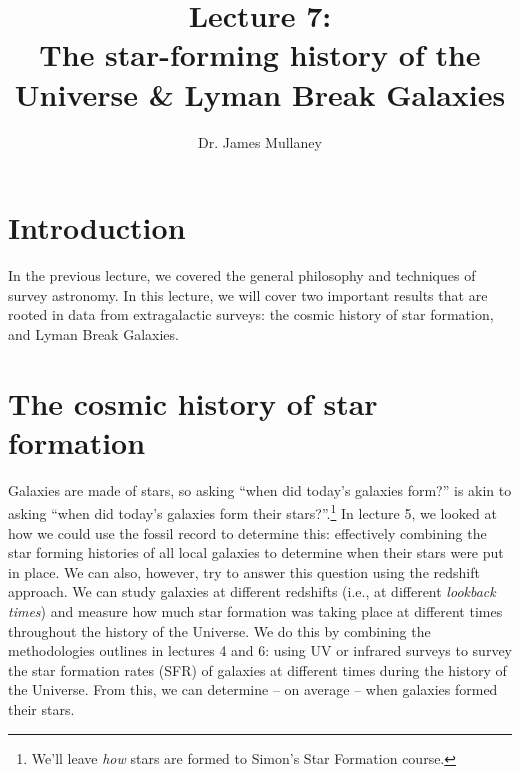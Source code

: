 \documentclass[11pt]{article}
\begin{document}
 
\title{Lecture 7:\\The star-forming history of the Universe \& Lyman Break Galaxies}
\author{Dr. James Mullaney}
\maketitle

\section{Introduction}
In the previous lecture, we covered the general philosophy and
techniques of survey astronomy. In this lecture, we will cover two
important results that are rooted in data from extragalactic surveys:
the cosmic history of star formation, and Lyman Break Galaxies.

\section{The cosmic history of star formation}
Galaxies are made of stars, so asking ``when did today's galaxies
form?'' is akin to asking ``when did today's galaxies form their
stars?''.\footnote{We'll leave {\it how} stars are formed to Simon's
  Star Formation course.} In lecture 5, we looked at how we could use
the fossil record to determine this: effectively combining the star
forming histories of all local galaxies to determine when their stars
were put in place. We can also, however, try to answer this question
using the redshift approach. We can study galaxies at different
redshifts (i.e., at different {\it lookback times}) and measure how
much star formation was taking place at different times throughout the
history of the Universe. We do this by combining the methodologies
outlines in lectures 4 and 6: using UV or infrared surveys to survey
the star formation rates (SFR) of galaxies at different times during the
history of the Universe. From this, we can determine -- on average --
when galaxies formed their stars.
\end{document}
